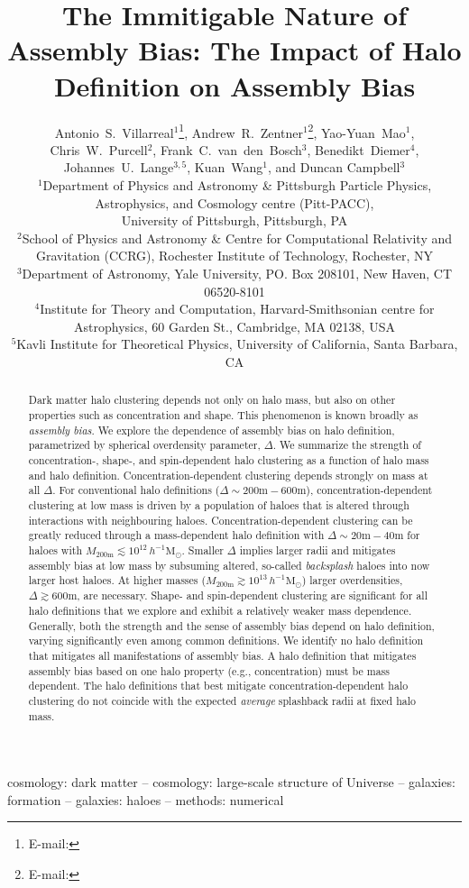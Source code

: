 \documentclass[usenatbib,fleqn]{mnras}
\title[The Immitigable Nature of Assembly Bias]{The Immitigable Nature of Assembly
Bias: The Impact of Halo Definition on Assembly Bias}
\author[A.~S.~Villarreal et al.]{%
Antonio~S.~Villarreal$^{1}$\thanks{E-mail: \email{asv13@pitt.edu}},
Andrew~R.~Zentner$^{1}$\thanks{E-mail: \email{zentner@pitt.edu}},
Yao-Yuan~Mao$^{1}$, %
Chris~W.~Purcell$^{2}$,%
\newauthor
Frank~C.~van~den~Bosch$^{3}$, %
Benedikt~Diemer$^{4}$, %
Johannes~U.~Lange$^{3,5}$,
Kuan~Wang$^{1}$, 
\newauthor
and Duncan Campbell$^{3}$
\vspace*{8pt}
\\
$^{1}$Department of Physics and Astronomy \& Pittsburgh Particle Physics, Astrophysics, and Cosmology centre (Pitt-PACC), \\
\phantom{$^{1}$}University of Pittsburgh, Pittsburgh, PA\\
$^{2}$School of Physics and Astronomy \& Centre for Computational Relativity and Gravitation (CCRG), Rochester Institute of Technology, Rochester, NY \\
$^{3}$Department of Astronomy, Yale University, PO. Box 208101, New Haven, CT 06520-8101\\
$^{4}$Institute for Theory and Computation, Harvard-Smithsonian centre for Astrophysics, 60 Garden St., Cambridge, MA 02138, USA \\
$^{5}$Kavli Institute for Theoretical Physics, University of California, Santa Barbara, CA}
\begin{document}
\label{firstpage}
\pagerange{\pageref{firstpage}--\pageref{lastpage}} 

\maketitle

\begin{abstract}
Dark matter halo clustering depends not only on halo mass, but also on other properties such as concentration and shape. This phenomenon is known broadly as {\em assembly bias}. We explore the dependence of assembly bias on halo definition, parametrized by spherical overdensity parameter, $\Delta$. We summarize the strength of concentration-, shape-, and spin-dependent halo clustering as a function of halo mass and halo definition. Concentration-dependent clustering depends strongly on mass at all $\Delta$. For conventional halo definitions ($\Delta \sim 200\mathrm{m}-600\mathrm{m}$), concentration-dependent clustering at low mass is driven by a population of haloes that is altered through interactions with neighbouring haloes. Concentration-dependent clustering can be greatly reduced through a mass-dependent halo definition with $\Delta \sim 20\mathrm{m}-40\mathrm{m}$ for haloes with $M_{200\mathrm{m}} \lesssim 10^{12}\, h^{-1}\mathrm{M}_{\odot}$. Smaller $\Delta$ implies larger radii and mitigates assembly bias at low mass by subsuming altered, so-called {\em backsplash} haloes into now larger host haloes. At higher masses ($M_{200\mathrm{m}} \gtrsim 10^{13}\, h^{-1}\mathrm{M}_{\odot}$) larger overdensities, $\Delta \gtrsim 600\mathrm{m}$, are necessary. Shape- and spin-dependent clustering are significant for all halo definitions that we explore and exhibit a relatively weaker mass dependence. Generally, both the strength and the sense of assembly bias depend on halo definition, varying significantly even among common definitions. We identify no halo definition that mitigates all manifestations of assembly bias. A halo definition that mitigates assembly bias based on one halo property (e.g., concentration) must be mass dependent. The halo definitions that best mitigate concentration-dependent halo clustering do not coincide with the expected {\em average} splashback radii at fixed halo mass.
\end{abstract}

\begin{keywords}
cosmology: dark matter -- cosmology: large-scale structure of Universe -- galaxies: formation -- galaxies: haloes -- methods: numerical
\end{keywords}
\end{document}
